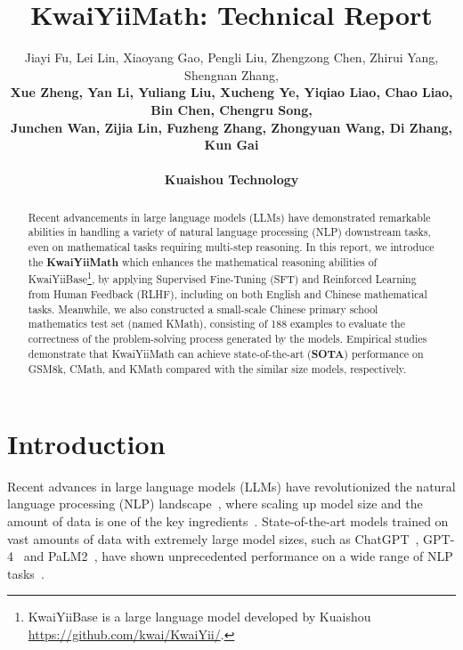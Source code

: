 \documentclass{article}
\title{KwaiYiiMath: Technical Report}
\author{Jiayi Fu, Lei Lin, Xiaoyang Gao, Pengli Liu, Zhengzong Chen, Zhirui Yang, Shengnan Zhang, \\
\textbf{Xue Zheng, Yan Li, Yuliang Liu, Xucheng Ye, Yiqiao Liao, Chao Liao, Bin Chen, Chengru Song, } \\
\textbf{Junchen Wan, Zijia Lin, Fuzheng Zhang, Zhongyuan Wang, Di Zhang, Kun Gai} \\
\\ \textbf{Kuaishou Technology} \\
}
\begin{document}
\renewcommand{\thefootnote}{}
\renewcommand{\thefootnote}{\arabic{footnote}}

\maketitle

\begin{abstract}
Recent advancements in large language models (LLMs) have demonstrated remarkable abilities in handling a variety of natural language processing (NLP) downstream tasks, even on mathematical tasks requiring multi-step reasoning. In this report, we introduce the \textbf{KwaiYiiMath} which enhances the mathematical reasoning abilities of KwaiYiiBase\footnote{KwaiYiiBase is a large language model developed by Kuaishou \url{https://github.com/kwai/KwaiYii/}.}, by applying Supervised Fine-Tuning (SFT) and Reinforced Learning from Human Feedback (RLHF), including on both English and Chinese mathematical tasks. Meanwhile, we also constructed a small-scale Chinese primary school mathematics test set (named KMath), consisting of 188 examples to evaluate the correctness of the problem-solving process generated by the models. Empirical studies demonstrate that KwaiYiiMath can achieve state-of-the-art (\textbf{SOTA}) performance on GSM8k, CMath, and KMath compared with the similar size models, respectively.


\end{abstract}

\section{Introduction}

Recent advances in large language models (LLMs) 
have revolutionized the natural language processing (NLP) landscape~\cite{kenton2019bert,brown2020language}, where scaling up model size and the amount of data is one of the key ingredients~\cite{rae2021scaling,chowdhery2022palm,anil2023palm,touvron2023llama,touvron2023llama2}.
State-of-the-art models trained on vast amounts of data with extremely large model sizes, such as ChatGPT~\cite{openai2022chatgpt}, GPT-4~\cite{openai2023gpt4} and PaLM2~\cite{anil2023palm}, have shown unprecedented performance on a wide range of NLP tasks~\cite{brown2020language,rae2021scaling,du2022glam,lewkowycz2022solving,chowdhery2022palm,ouyang2022training,tay2022ul2,openai2022chatgpt,openai2023gpt4,anil2023palm,touvron2023llama2}.
\end{document}

